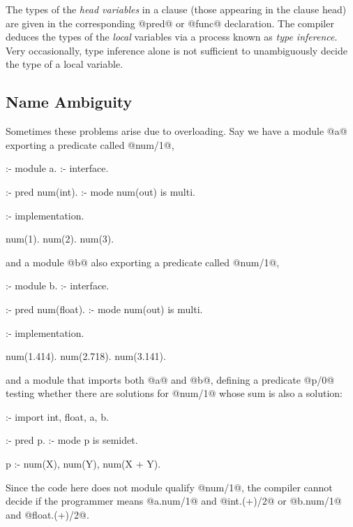 The types of the \emph{head variables} in a clause (\ie those appearing in
the clause head) are given in the corresponding @pred@ or @func@
declaration.  The compiler deduces the types of the \emph{local} variables
via a process known as \emph{type inference}.  Very occasionally, type
inference alone is not sufficient to unambiguously decide the type of a
local variable.

\subsection{Name Ambiguity}

Sometimes these problems arise due to overloading.  Say we have a module
@a@ exporting a predicate called @num/1@,
\begin{myverbatim}
:- module a.
:- interface.

:- pred num(int).
:- mode num(out) is multi.

:- implementation.

num(1).
num(2).
num(3).
\end{myverbatim}
and a module @b@ also exporting a predicate called @num/1@,
\begin{myverbatim}
:- module b.
:- interface.

:- pred num(float).
:- mode num(out) is multi.

:- implementation.

num(1.414).
num(2.718).
num(3.141).
\end{myverbatim}
and a module that imports both @a@ and @b@, defining a predicate @p/0@
testing whether there are solutions for @num/1@ whose sum is also a
solution:
\begin{myverbatim}
:- import int, float, a, b.

:- pred p.
:- mode p is semidet.

p :-
    num(X),
    num(Y),
    num(X + Y).
\end{myverbatim}
Since the code here does not module qualify @num/1@, the compiler cannot
decide if the programmer means @a.num/1@ and @int.(+)/2@ or @b.num/1@ and
@float.(+)/2@.

